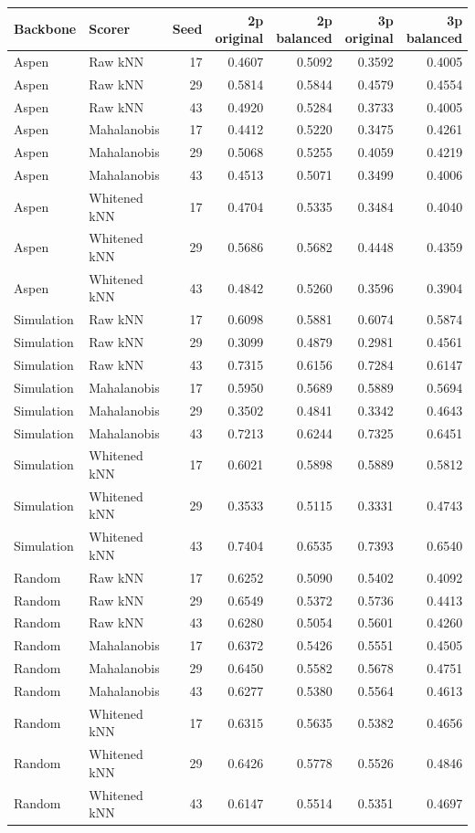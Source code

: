 \begin{tabular}{llrrrrr}
\toprule
Backbone & Scorer & Seed & 2p original & 2p balanced & 3p original & 3p balanced \\
\midrule
Aspen & Raw kNN & 17 & 0.4607 & 0.5092 & 0.3592 & 0.4005 \\
Aspen & Raw kNN & 29 & 0.5814 & 0.5844 & 0.4579 & 0.4554 \\
Aspen & Raw kNN & 43 & 0.4920 & 0.5284 & 0.3733 & 0.4005 \\
Aspen & Mahalanobis & 17 & 0.4412 & 0.5220 & 0.3475 & 0.4261 \\
Aspen & Mahalanobis & 29 & 0.5068 & 0.5255 & 0.4059 & 0.4219 \\
Aspen & Mahalanobis & 43 & 0.4513 & 0.5071 & 0.3499 & 0.4006 \\
Aspen & Whitened kNN & 17 & 0.4704 & 0.5335 & 0.3484 & 0.4040 \\
Aspen & Whitened kNN & 29 & 0.5686 & 0.5682 & 0.4448 & 0.4359 \\
Aspen & Whitened kNN & 43 & 0.4842 & 0.5260 & 0.3596 & 0.3904 \\
Simulation & Raw kNN & 17 & 0.6098 & 0.5881 & 0.6074 & 0.5874 \\
Simulation & Raw kNN & 29 & 0.3099 & 0.4879 & 0.2981 & 0.4561 \\
Simulation & Raw kNN & 43 & 0.7315 & 0.6156 & 0.7284 & 0.6147 \\
Simulation & Mahalanobis & 17 & 0.5950 & 0.5689 & 0.5889 & 0.5694 \\
Simulation & Mahalanobis & 29 & 0.3502 & 0.4841 & 0.3342 & 0.4643 \\
Simulation & Mahalanobis & 43 & 0.7213 & 0.6244 & 0.7325 & 0.6451 \\
Simulation & Whitened kNN & 17 & 0.6021 & 0.5898 & 0.5889 & 0.5812 \\
Simulation & Whitened kNN & 29 & 0.3533 & 0.5115 & 0.3331 & 0.4743 \\
Simulation & Whitened kNN & 43 & 0.7404 & 0.6535 & 0.7393 & 0.6540 \\
Random & Raw kNN & 17 & 0.6252 & 0.5090 & 0.5402 & 0.4092 \\
Random & Raw kNN & 29 & 0.6549 & 0.5372 & 0.5736 & 0.4413 \\
Random & Raw kNN & 43 & 0.6280 & 0.5054 & 0.5601 & 0.4260 \\
Random & Mahalanobis & 17 & 0.6372 & 0.5426 & 0.5551 & 0.4505 \\
Random & Mahalanobis & 29 & 0.6450 & 0.5582 & 0.5678 & 0.4751 \\
Random & Mahalanobis & 43 & 0.6277 & 0.5380 & 0.5564 & 0.4613 \\
Random & Whitened kNN & 17 & 0.6315 & 0.5635 & 0.5382 & 0.4656 \\
Random & Whitened kNN & 29 & 0.6426 & 0.5778 & 0.5526 & 0.4846 \\
Random & Whitened kNN & 43 & 0.6147 & 0.5514 & 0.5351 & 0.4697 \\
\bottomrule
\end{tabular}
